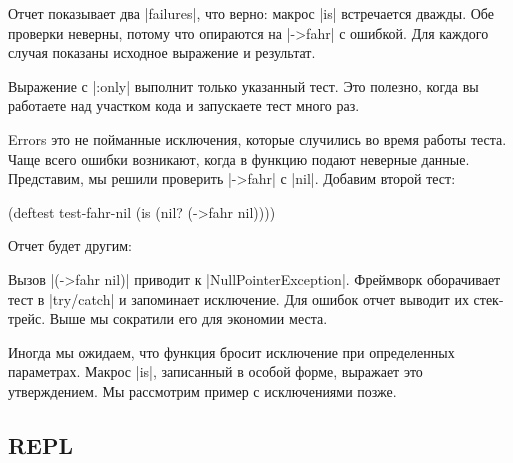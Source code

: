 Отчет показывает два \spverb|failures|, что верно: макрос \spverb|is|
встречается дважды. Обе проверки неверны, потому что опираются на
\spverb|->fahr| с ошибкой. Для каждого случая показаны исходное выражение и
результат.

Выражение с \spverb|:only| выполнит только указанный тест. Это полезно, когда вы
работаете над участком кода и запускаете тест много раз.

\begin{english}
\end{english}

Errors это не пойманные исключения, которые случились во время работы
теста. Чаще всего ошибки возникают, когда в функцию подают неверные
данные. Представим, мы решили проверить \spverb|->fahr| с \spverb|nil|. Добавим
второй тест:

\begin{english}
  \begin{clojure}
(deftest test-fahr-nil
  (is (nil? (->fahr nil))))
  \end{clojure}
\end{english}

Отчет будет другим:

\begin{english}
\end{english}

Вызов \spverb|(->fahr nil)| приводит к \spverb|NullPointerException|. Фреймворк
оборачивает тест в \spverb|try/catch| и запоминает исключение. Для ошибок отчет
выводит их стек-трейс. Выше мы сократили его для экономии места.

Иногда мы ожидаем, что функция бросит исключение при определенных
параметрах. Макрос \spverb|is|, записанный в особой форме, выражает это
утверждением. Мы рассмотрим пример с исключениями позже.

\subsection{REPL}

